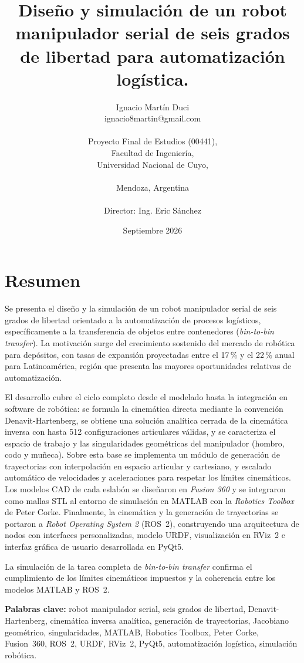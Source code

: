 \documentclass{article}
\title{Diseño y simulación de un robot manipulador serial de seis grados de libertad para automatización logística.}
\author{Ignacio Martín Duci \\ ignacio8martin@gmail.com \\ \\ Proyecto Final de Estudios (00441),\\ Facultad de Ingeniería, \\ Universidad Nacional de Cuyo, \\ \,\\Mendoza, Argentina \\ \\ Director: Ing. Eric Sánchez}
\date{Septiembre 2026}
\begin{document}
\thispagestyle{empty}
\pagestyle{fancyheader}
\justifying

\maketitle
\newpage
\section*{Resumen}

Se presenta el diseño y la simulación de un robot manipulador serial de seis grados de libertad orientado a la automatización de procesos logísticos, específicamente a la transferencia de objetos entre contenedores (\textit{bin-to-bin transfer}). La motivación surge del crecimiento sostenido del mercado de robótica para depósitos, con tasas de expansión proyectadas entre el 17\,\% y el 22\,\% anual para Latinoamérica, región que presenta las mayores oportunidades relativas de automatización.

El desarrollo cubre el ciclo completo desde el modelado hasta la integración en software de robótica: se formula la cinemática directa mediante la convención Denavit-Hartenberg, se obtiene una solución analítica cerrada de la cinemática inversa con hasta 512 configuraciones articulares válidas, y se caracteriza el espacio de trabajo y las singularidades geométricas del manipulador (hombro, codo y muñeca). Sobre esta base se implementa un módulo de generación de trayectorias con interpolación en espacio articular y cartesiano, y escalado automático de velocidades y aceleraciones para respetar los límites cinemáticos. Los modelos CAD de cada eslabón se diseñaron en \textit{Fusion 360} y se integraron como mallas STL al entorno de simulación en MATLAB con la \textit{Robotics Toolbox} de Peter Corke. Finalmente, la cinemática y la generación de trayectorias se portaron a \textit{Robot Operating System 2} (ROS~2), construyendo una arquitectura de nodos con interfaces personalizadas, modelo URDF, visualización en RViz~2 e interfaz gráfica de usuario desarrollada en PyQt5.

La simulación de la tarea completa de \textit{bin-to-bin transfer} confirma el cumplimiento de los límites cinemáticos impuestos y la coherencia entre los modelos MATLAB y ROS~2.

\medskip
\noindent\textbf{Palabras clave:} robot manipulador serial, seis grados de libertad, Denavit-Hartenberg, cinemática inversa analítica, generación de trayectorias, Jacobiano geométrico, singularidades, MATLAB, Robotics Toolbox, Peter Corke, Fusion~360, ROS~2, URDF, RViz~2, PyQt5, automatización logística, simulación robótica.
\end{document}
